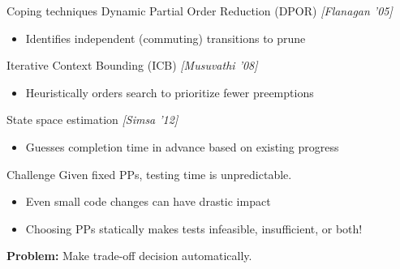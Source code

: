 \documentclass[xcolor=dvipsnames]{beamer}
\begin{document}
\begin{frame}{Coping techniques}
	Dynamic Partial Order Reduction (DPOR) {\em [Flanagan '05]}
	\begin{itemize}
		\item Identifies independent (commuting) transitions to prune
	\end{itemize}
	\pause
	\linegap

	Iterative Context Bounding (ICB) {\em [Musuvathi '08]}
	\begin{itemize}
		\item Heuristically orders search to prioritize fewer preemptions
	\end{itemize}
	\pause
	\linegap

	State space estimation {\em [Simsa '12]}
	\begin{itemize}
		\item Guesses completion time in advance based on existing progress
	\end{itemize}

\end{frame}

\begin{frame}{Challenge}
	Given fixed PPs, testing time is unpredictable.
	\begin{itemize}
		\item Even small code changes can have drastic impact
		\item Choosing PPs statically makes tests infeasible, insufficient, or both!
	\end{itemize}
	\linegap

	{\bf Problem:} Make trade-off decision automatically.
\end{frame}



\end{document}
